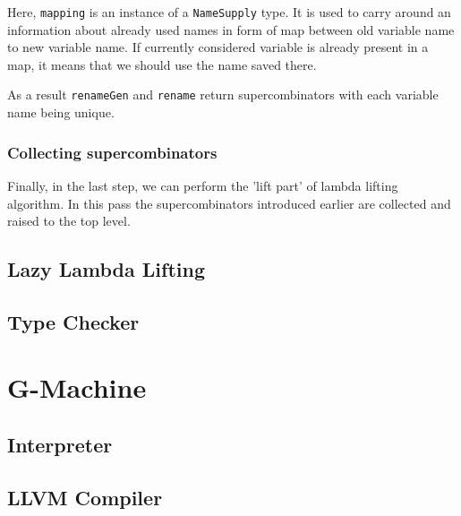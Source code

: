 \documentclass[a4paper]{report}
\begin{document}
Here, \texttt{mapping} is an instance of a \texttt{NameSupply} type. It is used
to carry around an information about already used names in form of map between
old variable name to new variable name. If currently considered variable is
already present in a map, it means that we should use the name saved there.

As a result \texttt{renameGen} and \texttt{rename} return supercombinators with
each variable name being unique.

\subsection{Collecting supercombinators}
Finally, in the last step, we can
perform the 'lift part' of lambda lifting algorithm. In this pass the
supercombinators introduced earlier are collected and raised to the top level.

\section{Lazy Lambda Lifting}
\section{Type Checker}


\chapter{G-Machine}
\section{Interpreter}
\section{LLVM Compiler}



\end{document}
